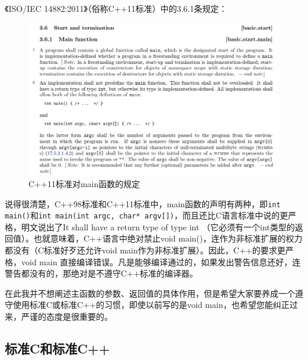 \documentclass[11pt,twoside,a4paper,titlepage]{article}	%
\begin{document}
《ISO/IEC 14882:2011》（俗称C++11标准）中的3.6.1条规定：

\begin{figure}[H]
\centering
\includegraphics[scale=.45]{../src/cpp11main.jpg}
\caption{C++11标准对main函数的规定}
\label{fig:cpp11main}
\end{figure}

说得很清楚，C++98标准和C++11标准中，main函数的声明有两种，即\verb|int main()|和\verb|int main(int argc, char* argv[])|，而且还比C语言标准中说的更严格，明文说出了It shall have a return type of type int （它必须有一个int类型的返回值）。也就意味着，C++语言中绝对禁止void main()，连作为非标准扩展的权力都没有（C标准好歹还允许void main作为非标准扩展）。因此，C++的要求更严格，void main 直接编译错误。凡是能够编译通过的，如果发出警告信息还好，连警告都没有的，那绝对是不遵守C++标准的编译器。

在此我并不想阐述主函数的参数、返回值的具体作用，但是希望大家要养成一个遵守使用标准C或标准C++的习惯，即使以前写的是void main，也希望您能纠正过来，严谨的态度是很重要的。

\subsection{标准C和标准C++}
\end{document}
